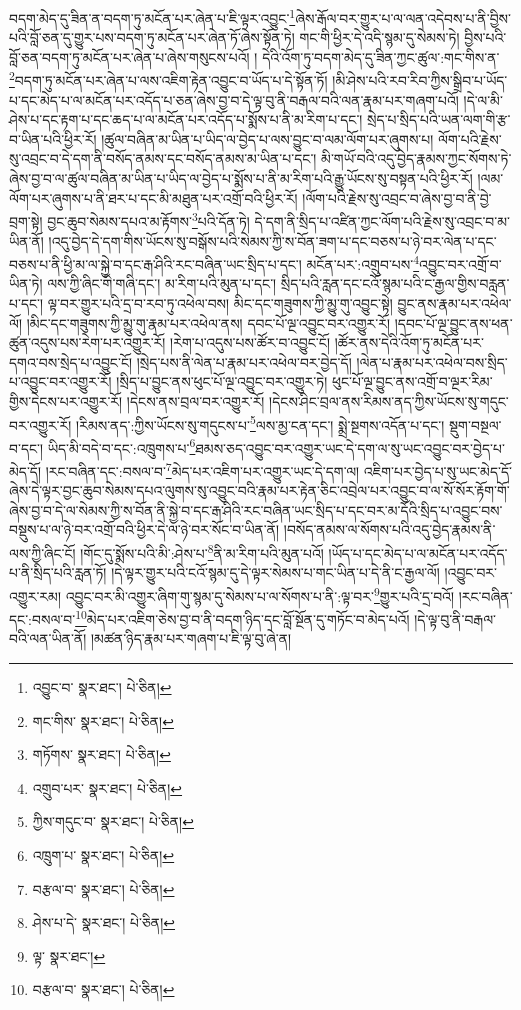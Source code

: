 བདག་མེད་དུ་ཟིན་ན་བདག་ཏུ་མངོན་པར་ཞེན་པ་ཇི་ལྟར་འབྱུང་\footnote{འབྱུང་བ་  སྣར་ཐང་།  པེ་ཅིན། }ཞེས་རྒོལ་བར་གྱུར་པ་ལ་ལན་འདེབས་པ་ནི་བྱིས་པའི་བློ་ཅན་དུ་གྱུར་པས་བདག་ཏུ་མངོན་པར་ཞེན་ཏོ་ཞེས་སྟོན་ཏེ། གང་གི་ཕྱིར་དེ་འདི་སྙམ་དུ་སེམས་ཏེ། བྱིས་པའི་བློ་ཅན་བདག་ཏུ་མངོན་པར་ཞེན་པ་ཞེས་གསུངས་པའོ། །
དེའི་འོག་ཏུ་བདག་མེད་དུ་ཟིན་ཀྱང་ཚུལ་:གང་གིས་ན་\footnote{གང་གིས་  སྣར་ཐང་།  པེ་ཅིན། }བདག་ཏུ་མངོན་པར་ཞེན་པ་ལས་འཇིག་རྟེན་འབྱུང་བ་ཡོད་པ་དེ་སྟོན་ཏོ། །མི་ཤེས་པའི་རབ་རིབ་ཀྱིས་སྒྲིབ་པ་ཡོད་པ་དང་མེད་པ་ལ་མངོན་པར་འདོད་པ་ཅན་ཞེས་བྱ་བ་དེ་ལྟ་བུ་ནི་བརྒལ་བའི་ལན་རྣམ་པར་གཞག་པའོ། །དེ་ལ་མི་ཤེས་པ་དང་རྟག་པ་དང་ཆད་པ་ལ་མངོན་པར་འདོད་པ་སྨོས་པ་ནི་མ་རིག་པ་དང་། སྲེད་པ་སྲིད་པའི་ཡན་ལག་གི་རྩ་བ་ཡིན་པའི་ཕྱིར་རོ། །ཚུལ་བཞིན་མ་ཡིན་པ་ཡིད་ལ་བྱེད་པ་ལས་བྱུང་བ་ལམ་ལོག་པར་ཞུགས་པ། ལོག་པའི་རྗེས་སུ་འབྲང་བ་དེ་དག་ནི་བསོད་ནམས་དང་བསོད་ནམས་མ་ཡིན་པ་དང་། མི་གཡོ་བའི་འདུ་བྱེད་རྣམས་ཀྱང་སོགས་ཏེ་ཞེས་བྱ་བ་ལ་ཚུལ་བཞིན་མ་ཡིན་པ་ཡིད་ལ་བྱེད་པ་སྨོས་པ་ནི་མ་རིག་པའི་རྒྱུ་ཡོངས་སུ་བསྟན་པའི་ཕྱིར་རོ། །ལམ་ལོག་པར་ཞུགས་པ་ནི་ཐར་པ་དང་མི་མཐུན་པར་འགྲོ་བའི་ཕྱིར་རོ། །ལོག་པའི་རྗེས་སུ་འབྲང་བ་ཞེས་བྱ་བ་ནི་བྱེ་བྲག་སྟེ། བྱང་ཆུབ་སེམས་དཔའ་མ་རྟོགས་\footnote{གཏོགས་  སྣར་ཐང་།  པེ་ཅིན། }པའི་དོན་ཏེ། དེ་དག་ནི་སྲིད་པ་འཛིན་ཀྱང་ལོག་པའི་རྗེས་སུ་འབྲང་བ་མ་ཡིན་ནོ། །འདུ་བྱེད་དེ་དག་གིས་ཡོངས་སུ་བསྒོས་པའི་སེམས་ཀྱི་ས་བོན་ཟག་པ་དང་བཅས་པ་ཉེ་བར་ལེན་པ་དང་བཅས་པ་ནི་ཕྱི་མ་ལ་སྐྱེ་བ་དང་རྒ་ཤིའི་རང་བཞིན་ཡང་སྲིད་པ་དང་། མངོན་པར་:འགྲུབ་པས་\footnote{འགྲུབ་པར་  སྣར་ཐང་།  པེ་ཅིན། }འབྱུང་བར་འགྲོ་བ་ཡིན་ཏེ། ལས་ཀྱི་ཞིང་གི་གཞི་དང་། མ་རིག་པའི་མུན་པ་དང་། སྲིད་པའི་རླན་དང་ངའོ་སྙམ་པའི་ང་རྒྱལ་གྱིས་བརླན་པ་དང་། ལྟ་བར་གྱུར་པའི་དྲ་བ་རབ་ཏུ་འཕེལ་བས། མིང་དང་གཟུགས་ཀྱི་མྱུ་གུ་འབྱུང་སྟེ། བྱུང་ནས་རྣམ་པར་འཕེལ་ལོ། །མིང་དང་གཟུགས་ཀྱི་མྱུ་གུ་རྣམ་པར་འཕེལ་ནས། དབང་པོ་ལྔ་འབྱུང་བར་འགྱུར་རོ། །དབང་པོ་ལྔ་བྱུང་ནས་ཕན་ཚུན་འདུས་པས་རེག་པར་འགྱུར་རོ། །རེག་པ་འདུས་པས་ཚོར་བ་འབྱུང་ངོ། །ཚོར་ནས་དེའི་འོག་ཏུ་མངོན་པར་དགའ་བས་སྲེད་པ་འབྱུང་ངོ། །སྲེད་པས་ནི་ལེན་པ་རྣམ་པར་འཕེལ་བར་བྱེད་དོ། །ལེན་པ་རྣམ་པར་འཕེལ་བས་སྲིད་པ་འབྱུང་བར་འགྱུར་རོ། །སྲིད་པ་བྱུང་ནས་ཕུང་པོ་ལྔ་འབྱུང་བར་འགྱུར་ཏེ། ཕུང་པོ་ལྔ་བྱུང་ནས་འགྲོ་བ་ལྔར་རིམ་གྱིས་དེངས་པར་འགྱུར་རོ། །དེངས་ནས་བྲལ་བར་འགྱུར་རོ། །དེངས་ཤིང་བྲལ་ནས་རིམས་ནད་ཀྱིས་ཡོངས་སུ་གདུང་བར་འགྱུར་རོ། །རིམས་ནད་:ཀྱིས་ཡོངས་སུ་གདུངས་པ་\footnote{ཀྱིས་གདུང་བ་  སྣར་ཐང་།  པེ་ཅིན། }ལས་མྱ་ངན་དང་། སྨྲེ་སྔགས་འདོན་པ་དང་། སྡུག་བསྔལ་བ་དང་། ཡིད་མི་བདེ་བ་དང་:འཁྲུགས་པ་\footnote{འཁྲུག་པ་  སྣར་ཐང་།  པེ་ཅིན། }ཐམས་ཅད་འབྱུང་བར་འགྱུར་ཡང་དེ་དག་ལ་སུ་ཡང་འབྱུང་བར་བྱེད་པ་མེད་དོ། །རང་བཞིན་དང་:བསལ་བ་\footnote{བརྩལ་བ་  སྣར་ཐང་།  པེ་ཅིན། }མེད་པར་འཇིག་པར་འགྱུར་ཡང་དེ་དག་ལ། འཇིག་པར་བྱེད་པ་སུ་ཡང་མེད་དོ་ཞེས་དེ་ལྟར་བྱང་ཆུབ་སེམས་དཔའ་ལུགས་སུ་འབྱུང་བའི་རྣམ་པར་རྟེན་ཅིང་འབྲེལ་པར་འབྱུང་བ་ལ་སོ་སོར་རྟོག་གོ་ཞེས་བྱ་བ་དེ་ལ་སེམས་ཀྱི་ས་བོན་ནི་སྐྱེ་བ་དང་རྒ་ཤིའི་རང་བཞིན་ཡང་སྲིད་པ་དང་བར་མ་དོའི་སྲིད་པ་འབྱུང་བས་བསྡུས་པ་ལ་ཉེ་བར་འགྲོ་བའི་ཕྱིར་དེ་ལ་ཉེ་བར་སོང་བ་ཡིན་ནོ། །བསོད་ནམས་ལ་སོགས་པའི་འདུ་བྱེད་རྣམས་ནི་ལས་ཀྱི་ཞིང་ངོ། །གོང་དུ་སྨོས་པའི་མི་:ཤེས་པ་\footnote{ཤེས་པ་དེ་  སྣར་ཐང་།  པེ་ཅིན། }ནི་མ་རིག་པའི་མུན་པའོ། །ཡོད་པ་དང་མེད་པ་ལ་མངོན་པར་འདོད་པ་ནི་སྲིད་པའི་རླན་ཏོ། །དེ་ལྟར་གྱུར་པའི་ངའོ་སྙམ་དུ་དེ་ལྟར་སེམས་པ་གང་ཡིན་པ་དེ་ནི་ང་རྒྱལ་ལོ། །འབྱུང་བར་འགྱུར་རམ། འབྱུང་བར་མི་འགྱུར་ཞིག་གུ་སྙམ་དུ་སེམས་པ་ལ་སོགས་པ་ནི་:ལྟ་བར་\footnote{ལྟ་  སྣར་ཐང་། }གྱུར་པའི་དྲ་བའོ། །རང་བཞིན་དང་:བསལ་བ་\footnote{བརྩལ་བ་  སྣར་ཐང་།  པེ་ཅིན། }མེད་པར་འཇིག་ཅེས་བྱ་བ་ནི་བདག་ཉིད་དང་བློ་སྔོན་དུ་གཏོང་བ་མེད་པའོ། །དེ་ལྟ་བུ་ནི་བརྒལ་བའི་ལན་ཡིན་ནོ། །མཚན་ཉིད་རྣམ་པར་གཞག་པ་ཇི་ལྟ་བུ་ཞེ་ན། 